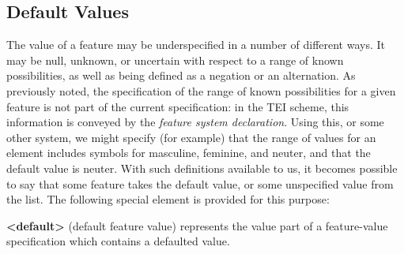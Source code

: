 \subsection[{Default Values}]{Default Values}\label{FSBO}\par
The value of a feature may be underspecified in a number of different ways. It may be null, unknown, or uncertain with respect to a range of known possibilities, as well as being defined as a negation or an alternation. As previously noted, the specification of the range of known possibilities for a given feature is not part of the current specification: in the TEI scheme, this information is conveyed by the \textit{feature system declaration}. Using this, or some other system, we might specify (for example) that the range of values for an element includes symbols for masculine, feminine, and neuter, and that the default value is neuter. With such definitions available to us, it becomes possible to say that some feature takes the default value, or some unspecified value from the list. The following special element is provided for this purpose: 
\begin{sansreflist}
  
\item [\textbf{<default>}] (default feature value) represents the value part of a feature-value specification which contains a defaulted value.
\end{sansreflist}
\par
